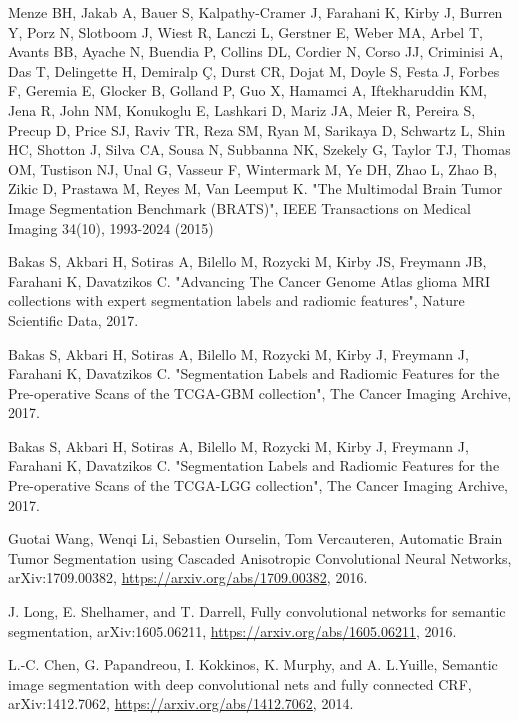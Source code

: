 \documentclass[11pt]{article}
\begin{document}
\begin{thebibliography}{9}

    Menze BH, Jakab A, Bauer S, Kalpathy-Cramer J, Farahani K, Kirby J, Burren Y, Porz N, Slotboom J, Wiest R, Lanczi L, Gerstner E, Weber MA, Arbel T, Avants BB, Ayache N, Buendia P, Collins DL, Cordier N, Corso JJ, Criminisi A, Das T, Delingette H, Demiralp Ç, Durst CR, Dojat M, Doyle S, Festa J, Forbes F, Geremia E, Glocker B, Golland P, Guo X, Hamamci A, Iftekharuddin KM, Jena R, John NM, Konukoglu E, Lashkari D, Mariz JA, Meier R, Pereira S, Precup D, Price SJ, Raviv TR, Reza SM, Ryan M, Sarikaya D, Schwartz L, Shin HC, Shotton J, Silva CA, Sousa N, Subbanna NK, Szekely G, Taylor TJ, Thomas OM, Tustison NJ, Unal G, Vasseur F, Wintermark M, Ye DH, Zhao L, Zhao B, Zikic D, Prastawa M, Reyes M, Van Leemput K. "The Multimodal Brain Tumor Image Segmentation Benchmark (BRATS)", IEEE Transactions on Medical Imaging 34(10), 1993-2024 (2015)

    Bakas S, Akbari H, Sotiras A, Bilello M, Rozycki M, Kirby JS, Freymann JB, Farahani K, Davatzikos C. "Advancing The Cancer Genome Atlas glioma MRI collections with expert segmentation labels and radiomic features", Nature Scientific Data, 2017.

    Bakas S, Akbari H, Sotiras A, Bilello M, Rozycki M, Kirby J, Freymann J, Farahani K, Davatzikos C. "Segmentation Labels and Radiomic Features for the Pre-operative Scans of the TCGA-GBM collection", The Cancer Imaging Archive, 2017.

    Bakas S, Akbari H, Sotiras A, Bilello M, Rozycki M, Kirby J, Freymann J, Farahani K, Davatzikos C. "Segmentation Labels and Radiomic Features for the Pre-operative Scans of the TCGA-LGG collection", The Cancer Imaging Archive, 2017.

  Guotai Wang, Wenqi Li, Sebastien Ourselin, Tom Vercauteren,
  Automatic Brain Tumor Segmentation using Cascaded Anisotropic Convolutional Neural Networks,
  arXiv:1709.00382,
  \url{https://arxiv.org/abs/1709.00382}, 2016.

  J. Long, E. Shelhamer, and T. Darrell,
  Fully convolutional networks for semantic segmentation,
  arXiv:1605.06211,
  \url{https://arxiv.org/abs/1605.06211}, 2016.

  L.-C. Chen, G. Papandreou, I. Kokkinos, K. Murphy, and A. L.Yuille,
  Semantic image segmentation with deep convolutional nets and fully connected CRF,
  arXiv:1412.7062,
  \url{https://arxiv.org/abs/1412.7062}, 2014.


\end{thebibliography}
\end{document}
